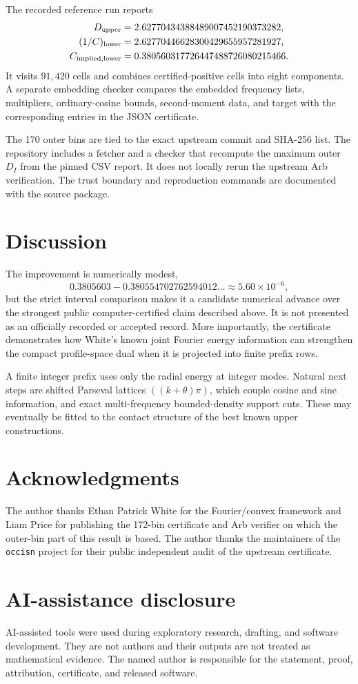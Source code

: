 \documentclass[11pt]{amsart}
\begin{document}
The recorded reference run reports
\[
 \begin{aligned}
 D_{\rm upper}&=2.62770434388489007452190373282,\\
 (1/C)_{\rm lower}&=2.62770446628300429655957281927,\\
 C_{\rm implied,lower}&=0.380560317726447488726080215466.
 \end{aligned}
\]
It visits $91{,}420$ cells and combines certified-positive cells into eight
components.  A separate embedding checker compares the embedded frequency
lists, multipliers, ordinary-cosine bounds, second-moment data, and target with
the corresponding entries in the JSON certificate.

The 170 outer bins are tied to the exact upstream commit and SHA-256 list.  The
repository includes a fetcher and a checker that recompute the maximum outer
$D_I$ from the pinned CSV report.  It does not locally rerun the upstream Arb
verification.  The trust boundary and reproduction commands are documented
with the source package.

\section{Discussion}

The improvement is numerically modest,
\[
 0.3805603-0.380554702762594012\ldots
 \approx5.60\times10^{-6},
\]
but the strict interval comparison makes it a candidate numerical advance
over the strongest public computer-certified claim described above.  It is
not presented as an officially recorded or accepted record.  More
importantly, the certificate demonstrates how White's known joint Fourier
energy information can strengthen the compact profile-space dual when it is
projected into finite prefix rows.

A finite integer prefix uses only the radial energy at integer modes.  Natural
next steps are shifted Parseval lattices $((k+\theta)\pi)$, which couple cosine
and sine information, and exact multi-frequency bounded-density support cuts.
These may eventually be fitted to the contact structure of the best known
upper constructions.

\section*{Acknowledgments}
The author thanks Ethan Patrick White for the Fourier/convex framework and Liam
Price for publishing the 172-bin certificate and Arb verifier on which the
outer-bin part of this result is based.  The author thanks the maintainers of
the \texttt{occisn} project for their public independent audit of the upstream
certificate.

\section*{AI-assistance disclosure}
AI-assisted tools were used during exploratory research, drafting, and software
development.  They are not authors and their outputs are not treated as
mathematical evidence.  The named author is responsible for the statement,
proof, attribution, certificate, and released software.


\end{document}
